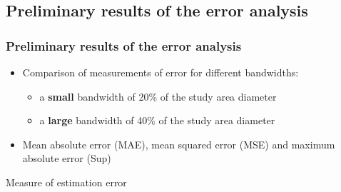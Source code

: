 \documentclass{beamer}
\theoremstyle{definition}
\begin{document}
\subsection{Preliminary results of the error analysis}
\begin{frame}\frametitle{Preliminary results of the error analysis}
    \begin{itemize}
        \item Comparison of measurements of error for different bandwidths:
        \begin{itemize}
            \item a \textbf{small} bandwidth of 20\% of the study area diameter
            \item a \textbf{large} bandwidth of 40\% of the study area diameter
        \end{itemize}
        \item Mean absolute error (MAE), mean squared error (MSE) and maximum absolute error (Sup)
    \end{itemize}
    \begin{table}{Measure of estimation error}
        \centering
    \end{table}
\end{frame}

\end{document}
